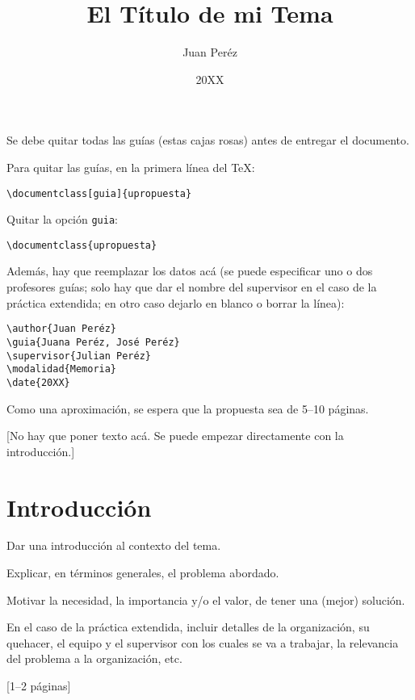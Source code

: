 \documentclass[guia]{upropuesta}
\title{El Título de mi Tema}
\author{Juan Peréz}
\date{20XX}
\begin{document}
\maketitle

\begin{pauta}
Se debe quitar todas las guías (estas cajas rosas) antes de entregar el documento.

Para quitar las guías, en la primera línea del \TeX: 

\begin{verbatim}
\documentclass[guia]{upropuesta}
\end{verbatim}

Quitar la opción \texttt{guia}:

\begin{verbatim}
\documentclass{upropuesta}
\end{verbatim}

Además, hay que reemplazar los datos acá (se puede especificar uno o dos profesores guías; solo hay que dar el nombre del supervisor en el caso de la práctica extendida; en otro caso dejarlo en blanco o borrar la línea):

\begin{verbatim}
\author{Juan Peréz}
\guia{Juana Peréz, José Peréz}
\supervisor{Julian Peréz}
\modalidad{Memoria}
\date{20XX}
\end{verbatim}

Como una aproximación, se espera que la propuesta sea de 5--10 páginas.

[No hay que poner texto acá. Se puede empezar directamente con la introducción.]
\end{pauta}

\section{Introducción}\label{sec:intro}

\begin{pauta}
Dar una introducción al contexto del tema.

Explicar, en términos generales, el problema abordado.

Motivar la necesidad, la importancia y/o el valor, de tener una (mejor) solución.

En el caso de la práctica extendida, incluir detalles de la organización, su quehacer, el equipo y el supervisor con los cuales se va a trabajar, la relevancia del problema a la organización, etc.

[1--2 páginas]
\end{pauta}
\end{document}
